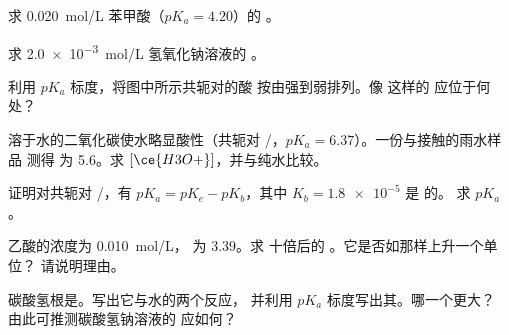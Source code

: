 \begin{exercise}[$\star\star$]\label{exo:g12:ka-and-pka:7}
求 \qty{0.020}{mol/L} 苯甲酸（$pK_a = 4.20$）的 。
\end{exercise}

\begin{exercise}[$\star\star$]\label{exo:g12:ka-and-pka:8}
求 \qty{2.0e-3}{mol/L} 氢氧化钠溶液的 。
\end{exercise}

\begin{exercise}[$\star\star$]\label{exo:g12:ka-and-pka:9}
利用 $pK_a$ 标度，将图中所示共轭对的酸
按由强到弱排列。像  这样的
应位于何处？
\end{exercise}

\begin{exercise}[$\star\star$]\label{exo:g12:ka-and-pka:10}
溶于水的二氧化碳使水略显酸性（共轭对
/，$pK_a = 6.37$）。一份与接触的雨水样品
测得  为 5.6。求 $[\ce{H3O+}]$，并与纯水比较。
\end{exercise}

\begin{exercise}[$\star\star$]\label{exo:g12:ka-and-pka:11}
证明对共轭对 /，有 $pK_a = pK_e - pK_b$，其中
$K_b = \num{1.8e-5}$ 是  的。
求 $pK_a$。
\end{exercise}

\begin{exercise}[$\star\star\star$]\label{exo:g12:ka-and-pka:12}
乙酸的浓度为 \qty{0.010}{mol/L}， 为 3.39。求
十倍后的 。它是否如那样上升一个单位？
请说明理由。
\end{exercise}

\begin{exercise}[$\star\star\star$]\label{exo:g12:ka-and-pka:13}
碳酸氢根是。写出它与水的两个反应，
并利用 $pK_a$ 标度写出其。哪一个更大？
由此可推测碳酸氢钠溶液的
 应如何？
\end{exercise}


